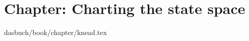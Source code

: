






\section{Chapter: Charting the state space}
\label{c-knead}\noindent dasbuch/book/chapter/knead.tex

